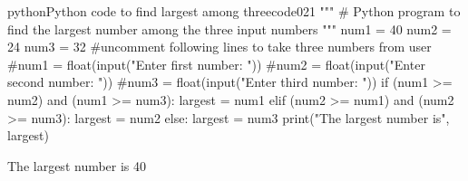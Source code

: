 \documentclass[a4paper]{article}
\begin{document}
\code 

\begin{codeInput}{python}{Python code to find largest among three}{code02}{1}
"""
# Python program to find the largest number among the three input numbers
"""
num1 = 40
num2 = 24
num3 = 32
#uncomment following lines to take three numbers from user
#num1 = float(input("Enter first number: "))
#num2 = float(input("Enter second number: "))
#num3 = float(input("Enter third number: "))
if (num1 >= num2) and (num1 >= num3):
   largest = num1
elif (num2 >= num1) and (num2 >= num3):
   largest = num2
else:
   largest = num3
print("The largest number is", largest)
\end{codeInput}

\results

\begin{result}
The largest number is 40
\end{result}
\end{document}
